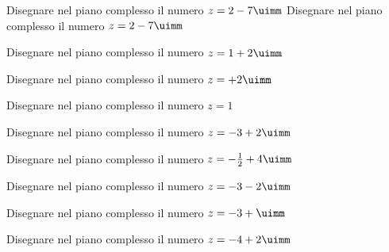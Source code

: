   \begin{exercise}
Disegnare nel piano complesso il numero $z=2-7\uimm$
	\tcblower
Disegnare nel piano complesso il numero $z=2-7\uimm$
	\begin{center}
		
		\label{fig:disegnopianocomplesso02}
	\end{center}
\end{exercise}
\begin{exercise}[no solution]
	Disegnare nel piano complesso il numero $z=1+2\uimm$
\end{exercise}
\begin{exercise}[no solution]
Disegnare nel piano complesso il numero $z=+2\uimm$
\end{exercise}
\begin{exercise}[no solution]
	Disegnare nel piano complesso il numero $z=1$
\end{exercise}
\begin{exercise}[no solution]
	Disegnare nel piano complesso il numero $z=-3+2\uimm$
\end{exercise}
\begin{exercise}[no solution]
	Disegnare nel piano complesso il numero $z=-\frac{1}{2}+4\uimm$
\end{exercise}
\begin{exercise}[no solution]
	Disegnare nel piano complesso il numero $z=-3-2\uimm$
\end{exercise}
\begin{exercise}[no solution]
	Disegnare nel piano complesso il numero $z=-3+\uimm$
\end{exercise}
\begin{exercise}[no solution]
	Disegnare nel piano complesso il numero $z=-4+2\uimm$
\end{exercise}

